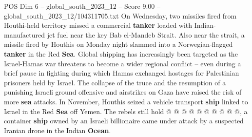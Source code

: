 \begin{textsample}{POS Dim 6 – global\_south\_2023\_12 – Score 9.00 – global\_south\_2023\_12/104311705.txt}
On Wednesday, two missiles fired from Houthi-held territory missed a commercial \textbf{tanker} loaded with Indian-manufactured jet fuel near the key Bab el-Mandeb Strait.
Also near the strait, a missile fired by Houthis on Monday night slammed into a Norwegian-flagged \textbf{tanker} in the Red \textbf{Sea}.
Global shipping has increasingly been targeted as the Israel-Hamas war threatens to become a wider regional conflict -- even during a brief pause in fighting during which Hamas exchanged hostages for Palestinian prisoners held by Israel.
The collapse of the truce and the resumption of a punishing Israeli ground offensive and airstrikes on Gaza have raised the risk of more \textbf{sea} attacks.
In November, Houthis seized a vehicle transport \textbf{ship} linked to Israel in the Red \textbf{Sea} off Yemen.
The rebels still hold @ @ @ @ @ @ @ @ @ @, a container \textbf{ship} owned by an Israeli billionaire came under attack by a suspected Iranian drone in the Indian \textbf{Ocean}.

\end{textsample}
